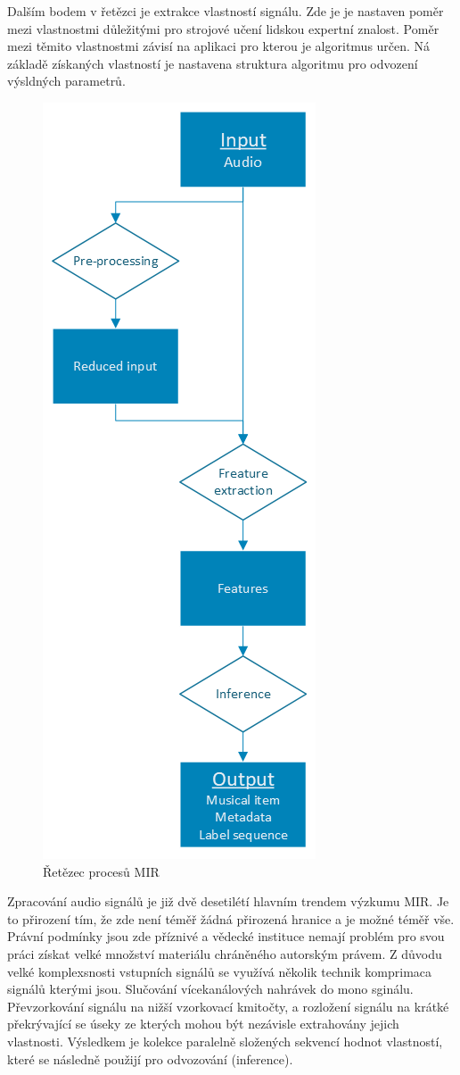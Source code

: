     Dalším bodem v řetězci je extrakce vlastností signálu. 
    Zde je je nastaven poměr mezi vlastnostmi důležitými pro strojové učení lidskou expertní znalost.
    Poměr mezi těmito vlastnostmi závisí na aplikaci pro kterou je algoritmus určen.
    Ná základě získaných vlastností je nastavena struktura algoritmu pro odvození výsldných parametrů.

\begin{figure}[H]
    \centering
    \includegraphics[width = 0.4\linewidth]{obrazky/MIR-diagram.png}
    \caption{Řetězec procesů MIR \cite{a_new_companion_to_digital_humanities}}
    \label{fig:MIR_diagram}
\end{figure}

    Zpracování audio signálů je již dvě desetilétí hlavním trendem výzkumu \acs*{MIR}.
    Je to přirození tím, že zde není téměř žádná přirozená hranice a je možné téměř vše.
    Právní podmínky jsou zde příznivé a vědecké instituce nemají problém pro svou práci získat velké množství materiálu chráněného autorským právem.
    Z důvodu velké komplexsnosti vstupních signálů se využívá několik technik komprimaca signálů kterými jsou. 
    Slučování vícekanálových nahrávek do mono sginálu. Převzorkování signálu na nižší vzorkovací kmitočty,
    a rozložení signálu na krátké překrývající se úseky ze kterých mohou být nezávisle extrahovány jejich vlastnosti. 
    Výsledkem je kolekce paralelně složených sekvencí hodnot vlastností, které se následně použijí pro odvozování (inference).


